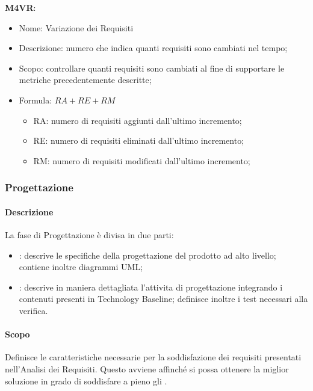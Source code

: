     \textbf{M4VR}:
    \begin{itemize}
      \item Nome: Variazione dei Requisiti
      \item Descrizione: numero che indica quanti requisiti sono cambiati nel tempo;
      \item Scopo: controllare quanti requisiti sono cambiati al fine di supportare le metriche precedentemente descritte;
      \item Formula: $ RA + RE + RM $
        \begin{itemize}
          \item RA: numero di requisiti aggiunti dall'ultimo incremento;
          \item RE: numero di requisiti eliminati dall'ultimo incremento;
          \item RM: numero di requisiti modificati dall'ultimo incremento;
        \end{itemize}
    \end{itemize}

	\subsubsection{Progettazione} 
    \paragraph{Descrizione} \hfill \break
    La fase di Progettazione è divisa in due parti:
		\begin{itemize}
			\item \textbf{}: descrive le specifiche della progettazione del prodotto ad alto livello; contiene inoltre diagrammi UML;
			\item \textbf{}: descrive in maniera dettagliata l'attivita di progettazione integrando i contenuti presenti in Technology Baseline; definisce inoltre i test necessari alla verifica.
		\end{itemize} 	
    
    \paragraph{Scopo} \hfill \break
    Definisce le caratteristiche necessarie per la soddisfazione dei requisiti presentati nell'Analisi dei Requisiti.
	  Questo avviene affinché si possa ottenere la miglior soluzione in grado di soddisfare a pieno gli .\\
		 
